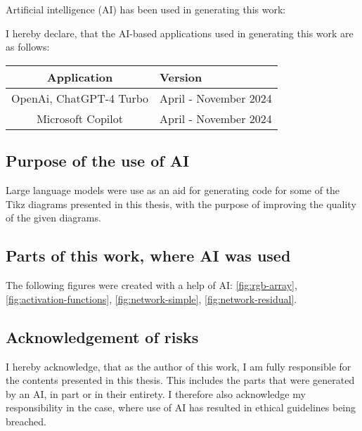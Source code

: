\clearpage
\chapter*{\@aidisclaimertitle}
Artificial intelligence (AI) has been used in generating this work:


I hereby declare, that the AI-based applications used in generating this work are as follows:

\begin{center}
    \begin{tabular}{c|l}
        \toprule
        \textbf{Application} & \textbf{Version} \\
        \midrule
        OpenAi, ChatGPT-4 Turbo & April - November 2024 \\
        Microsoft Copilot & April - November 2024 \\
        \bottomrule
    \end{tabular}
\end{center}

\section*{Purpose of the use of AI}

Large language models were use as an aid for generating code for some of the Tikz diagrams presented in this thesis, with the purpose of improving the quality of the given diagrams.


\section*{Parts of this work, where AI was used}


The following figures were created with a help of AI: \ref{fig:rgb-array}, \ref{fig:activation-functions}, \ref{fig:network-simple}, \ref{fig:network-residual}.

\section*{Acknowledgement of risks}

I hereby acknowledge, that as the author of this work, I am fully
responsible for the contents presented in this thesis. This includes
the parts that were generated by an AI, in part or in their entirety. I
therefore also acknowledge my responsibility in the case, where use of
AI has resulted in ethical guidelines being breached.

\clearpage
